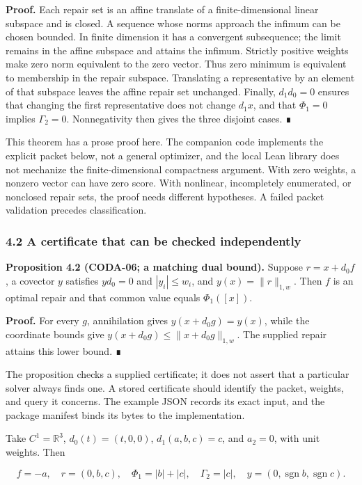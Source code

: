 \documentclass[
  11pt,
]{article}
\begin{document}
\textbf{Proof.} Each repair set is an affine translate of a finite-dimensional linear subspace and is closed. A sequence whose norms approach the infimum can be chosen bounded. In finite dimension it has a convergent subsequence; the limit remains in the affine subspace and attains the infimum. Strictly positive weights make zero norm equivalent to the zero vector. Thus zero minimum is equivalent to membership in the repair subspace. Translating a representative by an element of that subspace leaves the affine repair set unchanged. Finally, \(d_1d_0=0\) ensures that changing the first representative does not change \(d_1x\), and that \(\Phi_1=0\) implies \(\Gamma_2=0\). Nonnegativity then gives the three disjoint cases. ∎

This theorem has a prose proof here. The companion code implements the explicit packet below, not a general optimizer, and the local Lean library does not mechanize the finite-dimensional compactness argument. With zero weights, a nonzero vector can have zero score. With nonlinear, incompletely enumerated, or nonclosed repair sets, the proof needs different hypotheses. A failed packet validation precedes classification.

\subsubsection{4.2 A certificate that can be checked independently}\label{a-certificate-that-can-be-checked-independently}

\textbf{Proposition 4.2 (CODA-06; a matching dual bound).} Suppose \(r=x+d_0f\), a covector \(y\) satisfies \(y d_0=0\) and \(|y_i|\le w_i\), and \(y(x)=\|r\|_{1,w}\). Then \(f\) is an optimal repair and that common value equals \(\Phi_1([x])\).

\textbf{Proof.} For every \(g\), annihilation gives \(y(x+d_0g)=y(x)\), while the coordinate bounds give \(y(x+d_0g)\le\|x+d_0g\|_{1,w}\). The supplied repair attains this lower bound. ∎

The proposition checks a supplied certificate; it does not assert that a particular solver always finds one. A stored certificate should identify the packet, weights, and query it concerns. The example JSON records its exact input, and the package manifest binds its bytes to the implementation.

Take \(C^1=\mathbb R^3\), \(d_0(t)=(t,0,0)\), \(d_1(a,b,c)=c\), and \(a_2=0\), with unit weights. Then

\[
 f=-a,\quad r=(0,b,c),\quad
 \Phi_1=|b|+|c|,\quad\Gamma_2=|c|,
 \quad y=(0,\operatorname{sgn}b,\operatorname{sgn}c).
\]
\end{document}
